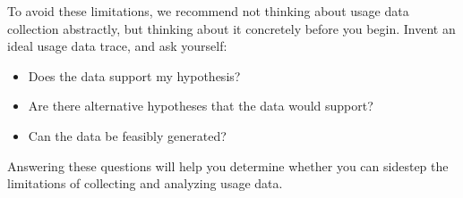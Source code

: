 To avoid these limitations, we recommend not thinking about 
usage data collection abstractly, but thinking about it concretely before
you begin.
Invent an ideal usage data trace, and ask yourself:

\begin{itemize}
  \item Does the data support my hypothesis?
  \item Are there alternative hypotheses that the data would support?
  \item Can the data be feasibly generated?
\end{itemize}

\noindent
Answering these questions will help you determine whether you can sidestep
the limitations of collecting and analyzing usage data.

%
%
%

